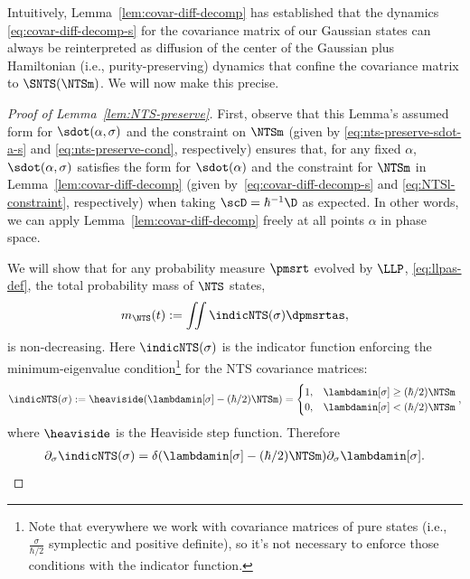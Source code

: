 \documentclass{article}
\numberwithin{equation}{section}
\begin{document}
Intuitively, Lemma~\ref{lem:covar-diff-decomp} has established that the dynamics \eqref{eq:covar-diff-decomp-s} for the covariance matrix of our Gaussian states can always be reinterpreted as diffusion of the center of the Gaussian plus Hamiltonian (i.e., purity-preserving) dynamics that confine the covariance matrix to $\SNTS(\NTSm)$. We will now make this precise. 
\begin{proof}[Proof of Lemma~\ref{lem:NTS-preserve}]
First, observe that this Lemma's assumed form for $\sdot(\alpha,\sigma)$ and the constraint on $\NTSm$ (given by \eqref{eq:nts-preserve-sdot-a-s} and \eqref{eq:nts-preserve-cond}, respectively) ensures that, for any fixed $\alpha$, $\sdot(\alpha,\sigma)$ satisfies the form for $\sdot(\alpha)$ and the constraint for $\NTSm$ in Lemma~\ref{lem:covar-diff-decomp} (given by~\eqref{eq:covar-diff-decomp-s} and \eqref{eq:NTSl-constraint}, respectively) when taking $\scD = \hbar^{-1}\D$ as expected.  In other words, we can apply Lemma~\ref{lem:covar-diff-decomp} freely at all points $\alpha$ in phase space. 

We will show that for any probability measure $\pmsrt$ 
evolved by $\LLP$, \eqref{eq:llpas-def}, the total probability mass of $\NTS$ states,
\begin{equation}
    m_\NTS(t) := 
    \iint \indicNTS(\sigma) \dpmsrtas,
\end{equation}
is non-decreasing.  Here $\indicNTS(\sigma)$ is the indicator function enforcing the minimum-eigenvalue condition\footnote{Note that everywhere we work with covariance matrices of pure states (i.e., $\frac{\sigma}{\hbar/2}$ symplectic and positive definite), so it's not necessary to enforce those conditions with the indicator function.} for the NTS covariance matrices: 
\begin{equation}
\indicNTS(\sigma) := \heaviside(\lambdamin[\sigma] - (\hbar/2)\NTSm) = \begin{cases}
1, & \lambdamin[\sigma] \geq (\hbar/2)\NTSm \\
0, & \lambdamin[\sigma] < (\hbar/2)\NTSm
\end{cases},
\end{equation}
where $\heaviside$ is the Heaviside step function. 
Therefore 
\begin{align}\label{eq:deriv-indic-NTS}
\partial_\sigma \indicNTS(\sigma) = \delta(\lambdamin[\sigma]-(\hbar/2)\NTSm)
\partial_\sigma \lambdamin[\sigma].
\end{align}  



\end{proof}
\end{document}
